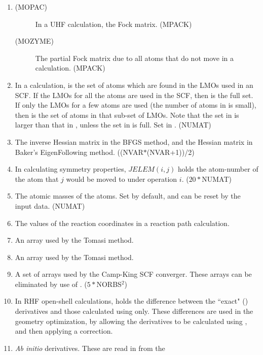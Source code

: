 \begin{enumerate}
\begin{description}
\end{description}
\item
\begin{description}
\item[(MOPAC) ] In a UHF calculation, the Fock matrix. (MPACK)
\item[(MOZYME) ] The partial Fock matrix due to all atoms that do
not move in a  calculation.  (MPACK)
\end{description}
\item {} In a  calculation,   is the set of
atoms which are found in the LMOs used in an SCF. If the LMOs for all the atoms
are used in the SCF, then  is the full set.  If only the LMOs for a
few atoms are used (the number of atoms in  is small), then
 is the set of atoms in that sub-set of LMOs.  Note that the set in
 is larger than that in , unless the set in 
is full.   Set in . (NUMAT)
\addtocounter{enumi}{1}
\item {} The inverse Hessian matrix in the BFGS method, and the
Hessian matrix in Baker's EigenFollowing  method. ((NVAR$*$(NVAR+1))/2)
\item {} In calculating symmetry properties, $JELEM(i,j)$ holds the
atom-number of the atom that $j$ would be moved to under operation 
$i$. ($20*$NUMAT)
\item {} The atomic masses of the atoms.  Set by default, and can
be reset by the input data. (NUMAT)
\item {} The values of the reaction coordinates in a reaction path
calculation.
\item {} An array used by the Tomasi method.
\item {} An array used by the Tomasi method.
\item {} A set of arrays used by the Camp-King SCF converger. 
These arrays can be eliminated by use of . ($5*$NORBS$^2$)
\item {} In RHF open-shell calculations,  
holds the difference
between the ``exact" () derivatives and those calculated using 
 only.  These differences are used in the geometry optimization, by
allowing the derivatives to be calculated using , and then applying
a correction.
\item {} {\em Ab initio} derivatives.  These are read in from the

\end{enumerate}
